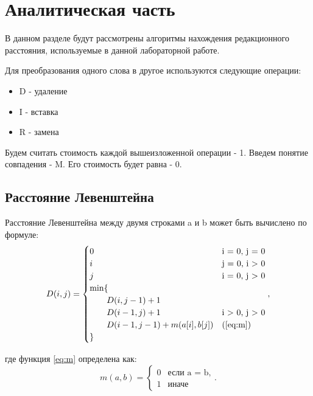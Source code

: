 \chapter{Аналитическая часть}
В данном разделе будут рассмотрены алгоритмы нахождения \cite{Levenshtein} редакционного расстояния, используемые в данной лабораторной работе.  

Для преобразования одного слова в другое используются следующие операции:

\begin{itemize}
	\item D - удаление
	\item I - вставка
	\item R - замена
\end{itemize}

Будем считать стоимость каждой вышеизложенной операции - 1.  
Введем понятие совпадения - M. Его стоимость будет равна - 0.



\section{Расстояние Левенштейна}

Расстояние Левенштейна между двумя строками a и b может быть вычислено по формуле:
\begin{equation}
	\label{eq:D}
	D(i, j) = \begin{cases}
		0 &\text{i = 0, j = 0}\\
		i &\text{j = 0, i > 0}\\
		j &\text{i = 0, j > 0}\\
		\min \lbrace \\
			\qquad D(i, j-1) + 1\\
			\qquad D(i-1, j) + 1 &\text{i > 0, j > 0}\\
			\qquad D(i-1, j-1) + m(a[i], b[j]) &\text(\ref{eq:m})\\
		\rbrace
	\end{cases},
\end{equation}

где функция \ref{eq:m} определена как:
\begin{equation}
	\label{eq:m}
	m(a, b) = \begin{cases}
		0 &\text{если a = b,}\\
		1 &\text{иначе}
	\end{cases}.
\end{equation}


